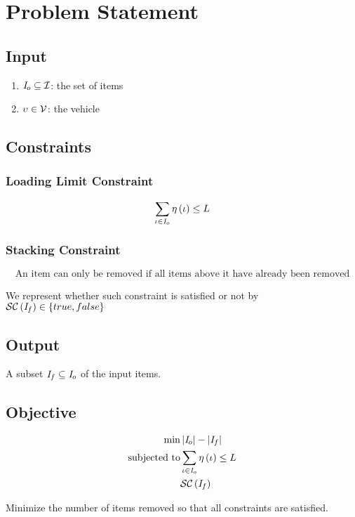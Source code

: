 \section{Problem Statement}

\subsection{Input}

\begin{enumerate}
	\item $\mathit{I}_{o} \subseteq \mathcal{I}$: the set of items
	\item $\upsilon \in \mathcal{V}$: the vehicle
\end{enumerate}

\subsection{Constraints}

\subsubsection*{Loading Limit Constraint}
\begin{equation}
	\label{constraint:loading-limit}
	\displaystyle\sum\limits_{\iota \in \mathit{I}_{o}}
		\eta \left( \iota \right)
		\leq L
\end{equation}

\subsubsection*{Stacking Constraint}
\begin{equation}
	\label{constraint:stacking}
	\mbox{An item can only be removed if all items above it have already been removed}
\end{equation}

We represent whether such constraint is satisfied or not by $\mathcal{SC} \left( \mathit{I}_{f} \right) \in \left\{true, false\right\}$

\subsection{Output}

A subset $\mathit{I}_{f} \subseteq \mathit{I}_{o}$ of the input items.

\subsection{Objective}

\begin{eqnarray}
	\label{problem:items-removal}
	\min & \left| \mathit{I}_{o} \right| - \left| \mathit{I}_{f} \right| \\
	\mbox{subjected to}
		& \displaystyle\sum\limits_{\iota \in \mathit{I}_{o}}
			\eta \left( \iota \right)
			\leq L \nonumber\\
		& \mathcal{SC} \left( \mathit{I}_{f} \right) \nonumber
\end{eqnarray}

Minimize the number of items removed so that all constraints are satisfied.
